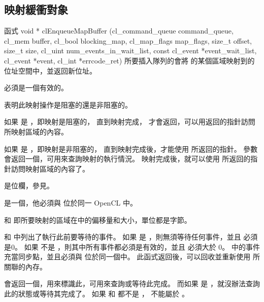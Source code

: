 \subsection{映射緩衝對象}

函式
\startCLFUNC
void * clEnqueueMapBuffer (cl_command_queue command_queue,
			cl_mem buffer,
			cl_bool blocking_map,
			cl_map_flags map_flags,
			size_t offset,
			size_t size,
			cl_uint num_events_in_wait_list,
			const cl_event *event_wait_list,
			cl_event *event,
			cl_int *errcode_ret)
\stopCLFUNC
所要插入隊列的會將  的某個區域映射到的位址空間中，並返回新位址。

 必須是一個有效的。

 表明此映射操作是{\ftRef 阻塞的}還是{\ftRef 非阻塞的}。

如果  是 ，即映射是阻塞的，
直到映射完成，  才會返回，可以用返回的指針訪問所映射區域的內容。

如果  是 ，即映射是非阻塞的，
直到映射完成後，才能使用  所返回的指針。
參數  會返回一個，可用來查詢映射的執行情況。
映射完成後，就可以使用  所返回的指針訪問映射區域的內容了。

 是位欄，參見。

 是一個，他必須與  位於同一 OpenCL 中。

 和  即所要映射的區域在中的偏移量和大小，單位都是字節。

 和  中列出了執行此前要等待的事件。
如果  是 ，則無須等待任何事件，並且  必須是0。
如果  不是 ，則其中所有事件都必須是有效的，並且  必須大於 0。
 中的事件充當同步點，並且必須與  位於同一個中。
此函式返回後，可以回收並重新使用  所關聯的內存。

 會返回一個，用來標識此，可用來查詢或等待此完成。
而如果  是 ，就沒辦法查詢此的狀態或等待其完成了。
如果  和  都不是 ，  不能屬於 。


